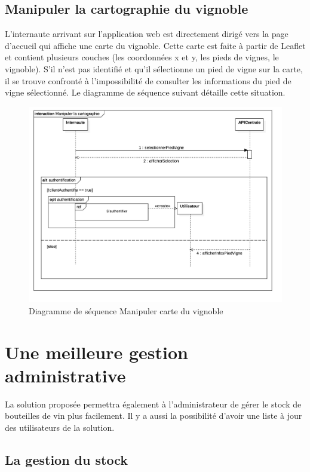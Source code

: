 \documentclass[a4paper, titlepage]{report}
\begin{document}
\subsection{Manipuler la cartographie du vignoble}

L'internaute arrivant sur l'application web est directement dirigé vers
la page d'accueil qui affiche une carte du vignoble. Cette carte est
faite à partir de Leaflet et contient plusieurs couches (les coordonnées
x et y, les pieds de vignes, le vignoble). S'il n'est pas identifié et
qu'il sélectionne un pied de vigne sur la carte, il se trouve confronté
à l'impossibilité de consulter les informations du pied de vigne
sélectionné. Le diagramme de séquence suivant détaille cette situation.

\clearpage
\begin{figure}[!h]
\centering
\includegraphics{Images/SequenceDiagramManipulerCarte.jpg}
\caption{Diagramme de séquence Manipuler carte du vignoble}
\end{figure}

\section{Une meilleure gestion administrative}

La solution proposée permettra également à l'administrateur de gérer le
stock de bouteilles de vin plus facilement. Il y a aussi la possibilité
d'avoir une liste à jour des utilisateurs de la solution.

\subsection{La gestion du stock}
\end{document}
